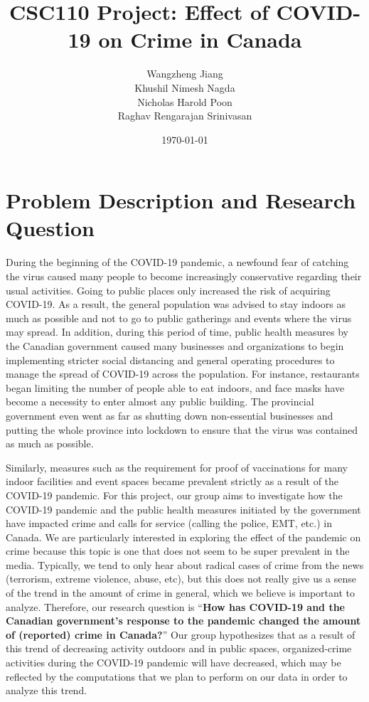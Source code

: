 \documentclass[fontsize=11pt]{article}
\title{CSC110 Project: \textbf{Effect of COVID-19 on Crime in Canada}}
\author{Wangzheng Jiang\\
		Khushil Nimesh Nagda\\
		Nicholas Harold Poon\\
		Raghav Rengarajan Srinivasan}
\date{\today}
\newcommand{\quotes}[1]{``#1''}
\begin{document}
\maketitle
\section{Problem Description and Research Question}
\par
During the beginning of the COVID-19 pandemic, a newfound fear of catching the virus caused many people to become increasingly conservative regarding their usual activities. Going to public places only increased the risk of acquiring COVID-19. As a result, the general population was advised to stay indoors as much as possible and not to go to public gatherings and events where the virus may spread. In addition, during this period of time, public health measures by the Canadian government caused many businesses and organizations to begin implementing stricter social distancing and general operating procedures to manage the spread of COVID-19 across the population. For instance, restaurants began limiting the number of people able to eat indoors, and face masks have become a necessity to enter almost any public building. The provincial government even went as far as shutting down non-essential businesses and putting the whole province into lockdown to ensure that the virus was contained as much as possible.

Similarly, measures such as the requirement for proof of vaccinations for many indoor facilities and event spaces became prevalent strictly as a result of the COVID-19 pandemic. For this project, our group aims to investigate how the COVID-19 pandemic and the public health measures initiated by the government have impacted crime and calls for service (calling the police, EMT, etc.) in Canada. We are particularly interested in exploring the effect of the pandemic on crime because this topic is one that does not seem to be super prevalent in the media. Typically, we tend to only hear about radical cases of crime from the news (terrorism, extreme violence, abuse, etc), but this does not really give us a sense of the trend in the amount of crime in general, which we believe is important to analyze. Therefore, our research question is \quotes{\textbf{How has COVID-19 and the Canadian government’s response to the pandemic changed the amount of (reported) crime in Canada?}} Our group hypothesizes that as a result of this trend of decreasing activity outdoors and in public spaces, organized-crime activities during the COVID-19 pandemic will have decreased, which may be reflected by the computations that we plan to perform on our data in order to analyze this trend.
\end{document}
